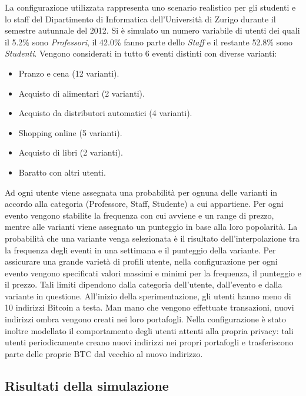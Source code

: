La configurazione utilizzata rappresenta uno scenario realistico per gli studenti e lo staff del Dipartimento di Informatica dell'Università di Zurigo durante il semestre autunnale del 2012.
Si è simulato un numero variabile di utenti dei quali il 5.2\% sono \emph{Professori}, il 42.0\% fanno parte dello \emph{Staff} e il restante 52.8\% sono \emph{Studenti}. Vengono considerati in tutto 6 eventi distinti con diverse varianti:
\begin{itemize}
    \item Pranzo e cena (12 varianti).
    \item Acquisto di alimentari (2 varianti).
    \item Acquisto da distributori automatici (4 varianti).
    \item Shopping online (5 varianti).
    \item Acquisto di libri (2 varianti).
    \item Baratto con altri utenti.
\end{itemize}
Ad ogni utente viene assegnata una probabilità per ognuna delle varianti in accordo alla categoria (Professore, Staff, Studente) a cui appartiene.
Per ogni evento vengono stabilite la frequenza con cui avviene e un range di prezzo, mentre alle varianti viene assegnato un punteggio in base alla loro popolarità. La probabilità che una variante venga selezionata è il risultato dell'interpolazione tra la frequenza degli eventi in una settimana e il punteggio della variante.
Per assicurare una grande varietà di profili utente, nella configurazione per ogni evento vengono specificati valori massimi e minimi per la frequenza, il punteggio e il prezzo. Tali limiti dipendono dalla categoria dell'utente, dall'evento e dalla variante in questione.
All'inizio della sperimentazione, gli utenti hanno meno di 10 indirizzi Bitcoin a testa. Man mano che vengono effettuate transazioni, nuovi indirizzi ombra vengono creati nei loro portafogli.
Nella configurazione è stato inoltre modellato il comportamento degli utenti attenti alla propria privacy: tali utenti periodicamente creano nuovi indirizzi nei propri portafogli e trasferiscono parte delle proprie BTC dal vecchio al nuovo indirizzo.

\subsection{Risultati della simulazione}\label{risultati-simulazione}

